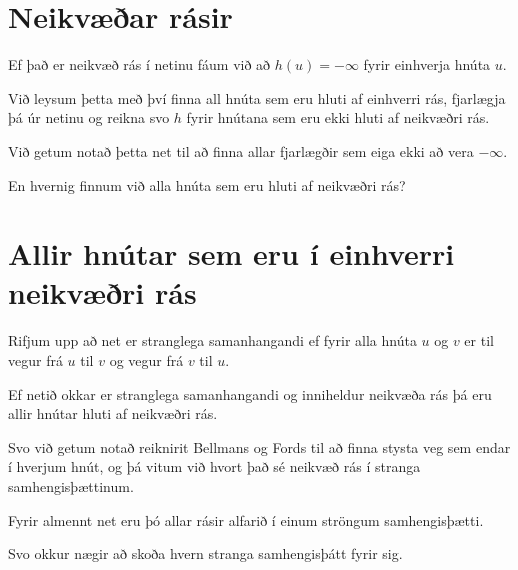 \section{Neikvæðar rásir}
{
    {
        \item<1-> Ef það er neikvæð rás í netinu fáum við að $h(u) = -\infty$ fyrir einhverja hnúta $u$.
        \item<2-> Við leysum þetta með því finna all hnúta sem eru hluti af einhverri rás,
                    fjarlægja þá úr netinu og reikna svo $h$ fyrir hnútana sem eru ekki hluti af neikvæðri rás.
        \item<3-> Við getum notað þetta net til að finna allar fjarlægðir sem eiga ekki að vera $-\infty$.
        \item<4-> En hvernig finnum við alla hnúta sem eru hluti af neikvæðri rás?
    }
}

\section{Allir hnútar sem eru í einhverri neikvæðri rás}
{
    {
        \item<1-> Rifjum upp að net er stranglega samanhangandi ef fyrir alla hnúta $u$ og $v$ er til vegur frá $u$ til $v$ og vegur frá $v$ til $u$.
        \item<2-> Ef netið okkar er stranglega samanhangandi og inniheldur neikvæða rás þá eru allir hnútar hluti af neikvæðri rás.
        \item<3-> Svo við getum notað reiknirit Bellmans og Fords til að finna stysta veg sem endar í hverjum hnút,
                    og þá vitum við hvort það sé neikvæð rás í stranga samhengisþættinum.
        \item<4-> Fyrir almennt net eru þó allar rásir alfarið í einum ströngum samhengisþætti.
        \item<5-> Svo okkur nægir að skoða hvern stranga samhengisþátt fyrir sig.
    }
}

